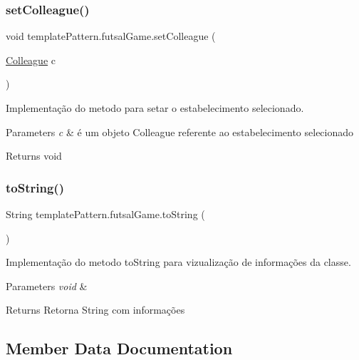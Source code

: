 \subsubsection{\texorpdfstring{setColleague()}{setColleague()}}
{\footnotesize\ttfamily void template\+Pattern.\+futsal\+Game.\+set\+Colleague (\begin{DoxyParamCaption}\item[{\mbox{\hyperlink{classmediator_pattern_1_1_colleague}{Colleague}}}]{c }\end{DoxyParamCaption})}



Implementação do metodo para setar o estabelecimento selecionado. 


\begin{DoxyParams}{Parameters}
{\em c} & é um objeto Colleague referente ao estabelecimento selecionado \\
\hline
\end{DoxyParams}
\begin{DoxyReturn}{Returns}
void 
\end{DoxyReturn}
\mbox{\label{classtemplate_pattern_1_1futsal_game_aad600d066e4b7ad5270a670dedb463c4}} 
\subsubsection{\texorpdfstring{toString()}{toString()}}
{\footnotesize\ttfamily String template\+Pattern.\+futsal\+Game.\+to\+String (\begin{DoxyParamCaption}{ }\end{DoxyParamCaption})}



Implementação do metodo to\+String para vizualização de informações da classe. 


\begin{DoxyParams}{Parameters}
{\em void} & \\
\hline
\end{DoxyParams}
\begin{DoxyReturn}{Returns}
Retorna String com informações 
\end{DoxyReturn}


\subsection{Member Data Documentation}
\mbox{\label{classtemplate_pattern_1_1futsal_game_a238d93a4c64b26413aeeb0c22b48d288}} 

